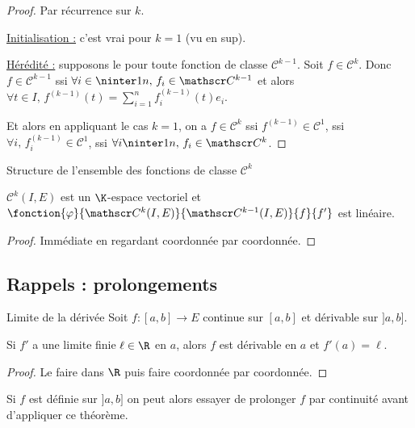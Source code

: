 
\begin{proof}
    Par récurrence sur $k$. 

    \uline{Initialisation :} c'est vrai pour $k = 1$ (vu en sup).

    \uline{Hérédité :} supposons le pour toute fonction de classe $\mathscr C^{k - 1} $. Soit 
    $f \in \mathscr C^k$. Donc $f \in \mathscr C^{k-1}$ ssi $\forall i \in \ninter 1 n, \, f_i \in \mathscr C^{k-1}$ 
    et alors $\displaystyle \forall t \in I, \, f^{(k-1)}(t) = \sum_{i=1}^n f_i^{(k-1)}(t)e_i$.

    Et alors en appliquant le cas $k = 1$, on a $f \in \mathscr C^k$ ssi $f^{(k-1)} \in \mathscr C^1$, 
    ssi $\forall i, \, f_i^{(k-1)} \in \mathscr C^1$, ssi $\forall i \ninter 1 n, \, f_i \in \mathscr C^k$.
\end{proof}

\begin{proposition}{Structure de l'ensemble des fonctions de classe $\mathscr C^k$}{}

    $\mathscr C^k(I, E)$ est un $\K$-espace vectoriel et
    $\fonction{\varphi}{\mathscr C^k(I, E)}{\mathscr C^{k-1}(I, E)}{f}{f'}$ est linéaire.
\end{proposition}

\begin{proof}
    Immédiate en regardant coordonnée par coordonnée.
\end{proof}

\subsection{Rappels : prolongements}

\begin{theoreme}{Limite de la dérivée}{}
    Soit $f : [a, b] \to E$ continue sur $[a, b]$ et dérivable sur $]a, b]$. 

    Si $f'$ a une limite finie $\ell \in \R$ en $a$, alors $f$ est dérivable en $a$ et $f'(a) = \ell$.
\end{theoreme}

\begin{proof}
    Le faire dans $\R$ puis faire coordonnée par coordonnée.
\end{proof}

\begin{remarque}
    Si $f$ est définie sur $]a,b]$ on peut alors essayer de prolonger $f$ par continuité avant d'appliquer ce théorème.
\end{remarque}

